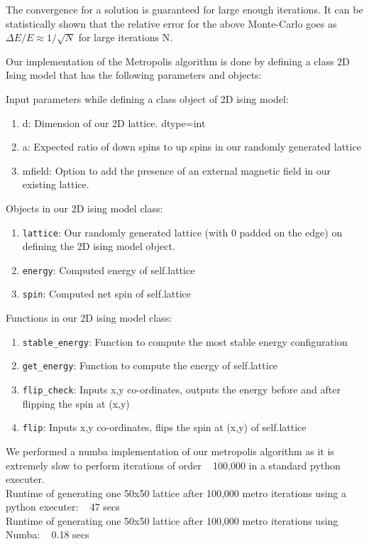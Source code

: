 The convergence for a solution is guaranteed for large enough iterations. It can be statistically shown that the relative error for the above Monte-Carlo goes as $\Delta E/E \approx 1/\sqrt{N}$ for large iterations N.

Our implementation of the Metropolis algorithm is done by defining a class 2D Ising model that has the following parameters and objects:

Input parameters while defining a class object of 2D ising model:
\begin{enumerate}

    \item d: Dimension of our 2D lattice. dtype=int
    \item a: Expected ratio of down spins to up spins in our randomly generated lattice
    \item mfield: Option to add the presence of an external magnetic field in our existing lattice.

\end{enumerate}

Objects in our 2D ising model class:
\begin{enumerate}
    \item \texttt{lattice}: Our randomly generated lattice (with 0 padded on the edge) on defining the 2D ising model object.
    \item \texttt{energy}: Computed energy of self.lattice
    \item \texttt{spin}: Computed net spin of self.lattice
\end{enumerate}

Functions in our 2D ising model class:
\begin{enumerate}
    \item \texttt{stable\_energy}: Function to compute the most stable energy configuration
    \item \texttt{get\_energy}: Function to compute the energy of self.lattice
    \item \texttt{flip\_check}: Inputs x,y co-ordinates, outputs the energy before and after flipping the spin at (x,y)
    \item \texttt{flip}: Inputs x,y co-ordinates, flips the spin at (x,y) of self.lattice
\end{enumerate}

We performed a numba implementation of our metropolis algorithm as it is extremely slow to perform iterations of order ~ 100,000 in a standard python executer. \\
Runtime of generating one 50x50 lattice after 100,000 metro iterations using a python executer: ~ 47 secs\\
Runtime of generating one 50x50 lattice after 100,000 metro iterations using Numba: ~ 0.18 secs


